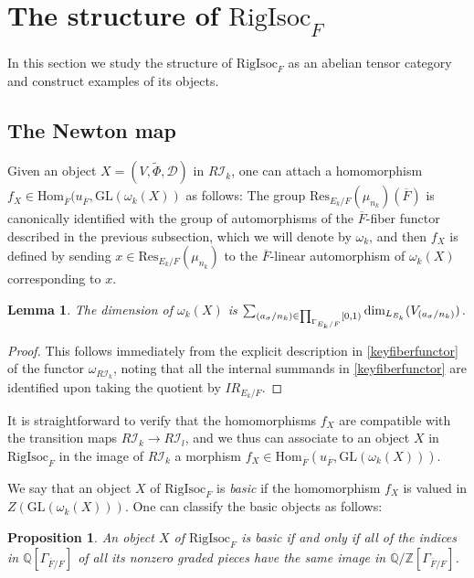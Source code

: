 \documentclass[11pt]{amsart}
\newtheorem{lem}[thm]{Lemma}
\newtheorem{prop}[thm]{Proposition}
\theoremstyle{definition}
\newcommand{\mc}{\mathcal}
\newcommand{\ov}{\overline}
\newcommand{\RigIsoc}{\mathrm{RigIsoc}}
\newcommand{\GL}{\mathrm{GL}}
\begin{document}
\section{The structure of $\RigIsoc_{F}$}

In this section we study the structure of $\RigIsoc_{F}$ as an abelian tensor category and construct examples of its objects.


\subsection{The Newton map}
Given an object $X = (V,\tilde{\Phi},\mc{D})$ in $R\mc{I}_{k}$, one can attach a homomorphism $f_{X} \in \text{Hom}_{\ov{F}}(u_{\ov{F}}, \GL(\omega_{k}(X))$ as follows: The group $\mathrm{Res}_{E_{k}/F}(\mu_{n_{k}})(\ov{F})$ is canonically identified with the group of automorphisms of the $\ov{F}$-fiber functor described in the previous subsection, which we will denote by $\omega_{k}$, and then $f_{X}$ is defined by sending $x \in \mathrm{Res}_{E_{k}/F}(\mu_{n_{k}})$ to the $\ov{F}$-linear automorphism of $\omega_{k}(X)$ corresponding to $x$.

\begin{lem}
The dimension of $\omega_{k}(X)$ is $\sum_{(a_{\sigma}/n_{k}) \in \prod_{\Gamma_{E_{k}/F}}[0,1)} \textnormal{dim}_{L_{E_{k}}}(V_{(a_{\sigma}/n_{k})})$.    
\end{lem}

\begin{proof}
This follows immediately from the explicit description in \eqref{keyfiberfunctor} of the functor $\omega_{R\mc{I}_{k}}$, noting that all the internal summands in \eqref{keyfiberfunctor} are identified upon taking the quotient by $IR_{E_{k}/F}$.
\end{proof}

It is straightforward to verify that the homomorphisms $f_{X}$ are compatible with the transition maps $R\mc{I}_{k} \to R\mc{I}_{l}$, and we thus can associate to an object $X$ in $\RigIsoc_{F}$ in the image of $R\mc{I}_{k}$ a morphism $f_{X} \in \text{Hom}_{\ov{F}}(u_{\ov{F}}, \GL(\omega_{k}(X)))$.

We say that an object $X$ of $\RigIsoc_{F}$ is \textit{basic} if the homomorphism $f_{X}$ is valued in $Z(\GL(\omega_{k}(X)))$. One can classify the basic objects as follows:

\begin{prop}\label{prop:Newton}
    An object $X$ of $\RigIsoc_{F}$ is basic if and only if all of the indices in $\mathbb{Q}[\Gamma_{\ov{F}/F}]$ of all its nonzero graded pieces have the same image in $\mathbb{Q}/\mathbb{Z}[\Gamma_{\ov{F}/F}]$. 
\end{prop}
\end{document}
